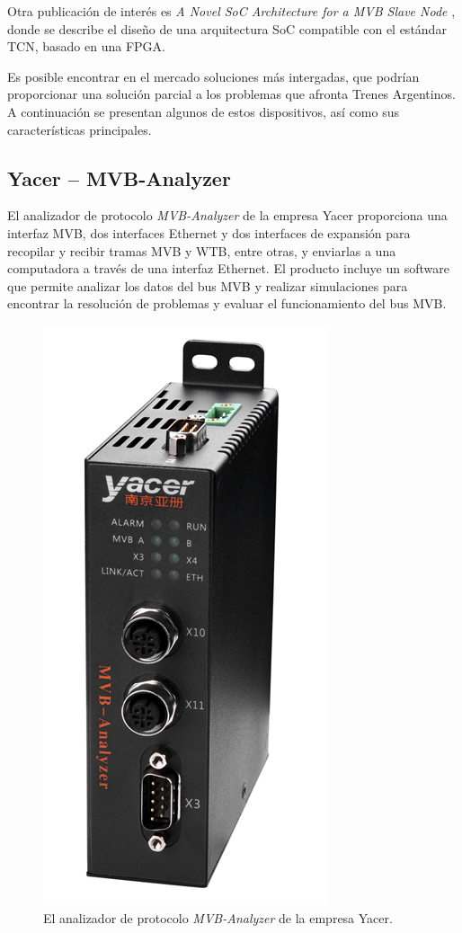 Otra publicación de interés es \textit{A Novel SoC Architecture for a MVB Slave Node} \cite{mvb-pub-3}, donde se describe el diseño de una arquitectura SoC compatible con el estándar TCN, basado en una FPGA.

Es posible encontrar en el mercado soluciones más intergadas, que podrían proporcionar una solución parcial a los problemas que afronta Trenes Argentinos. A continuación se presentan algunos de estos dispositivos, así como sus características principales.

\subsection{Yacer -- MVB-Analyzer}

El analizador de protocolo \textit{MVB-Analyzer} de la empresa Yacer \cite{yacer} proporciona una interfaz MVB, dos interfaces Ethernet y dos interfaces de expansión para recopilar y recibir tramas MVB y WTB, entre otras, y enviarlas a una computadora a través de una interfaz Ethernet. El producto incluye un software que permite analizar los datos del bus MVB y realizar simulaciones para encontrar la resolución de problemas y evaluar el funcionamiento del bus MVB.

\begin{figure}[htbp]
	\centering
	\includegraphics[height=20\baselineskip]{./Figures/yacer.jpg}
	\caption[Yacer -- MVB-Analyzer]{El analizador de protocolo \textit{MVB-Analyzer} de la empresa Yacer.}
\end{figure}

